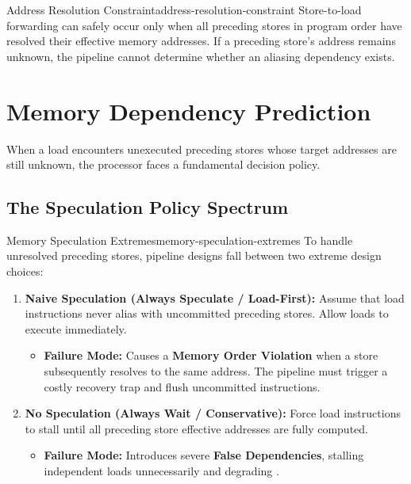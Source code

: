 \begin{observation}{Address Resolution Constraint}{address-resolution-constraint}
Store-to-load forwarding can safely occur only when all preceding stores in program order have resolved their effective memory addresses. If a preceding store's address remains unknown, the pipeline cannot determine whether an aliasing dependency exists.
\end{observation}

\section{Memory Dependency Prediction}
\label{sec:memory_dependency_prediction}

When a load encounters unexecuted preceding stores whose target addresses are still unknown, the processor faces a fundamental decision policy.

\subsection{The Speculation Policy Spectrum}

\begin{concept}{Memory Speculation Extremes}{memory-speculation-extremes}
To handle unresolved preceding stores, pipeline designs fall between two extreme design choices:
\begin{enumerate}
    \item \textbf{Naive Speculation (Always Speculate / Load-First):} Assume that load instructions never alias with uncommitted preceding stores. Allow loads to execute immediately.
    \begin{itemize}
        \item \textbf{Failure Mode:} Causes a \textbf{Memory Order Violation} when a store subsequently resolves to the same address. The pipeline must trigger a costly recovery trap and flush uncommitted instructions.
    \end{itemize}
    \item \textbf{No Speculation (Always Wait / Conservative):} Force load instructions to stall until all preceding store effective addresses are fully computed.
    \begin{itemize}
        \item \textbf{Failure Mode:} Introduces severe \textbf{False Dependencies}, stalling independent loads unnecessarily and degrading .
    \end{itemize}
\end{enumerate}
\end{concept}

